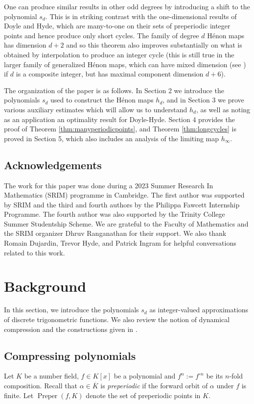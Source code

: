 \documentclass[12pt]{amsart}
\DeclareMathOperator{\preper}{Preper}
\theoremstyle{definition}
\begin{document}
One can produce similar results in other odd degrees by introducing a shift to the polynomial $s_d$.  This is in striking contrast with the one-dimensional results of Doyle and Hyde, which are many-to-one on their sets of preperiodic integer points and hence produce only short cycles.  The family of degree $d$ H\'enon maps has dimension $d+2$ and so this theorem also improves substantially on what is obtained by interpolation to produce an integer cycle (this is still true in the larger family of generalized H\'enon maps, which can have mixed dimension (see \cite{FriMil}) if $d$ is a composite integer, but has maximal component dimension $d+6$). 

The organization of the paper is as follows.  In Section 2 we introduce the polynomials $s_d$ used to construct the H\'enon maps $h_d$, and in Section 3 we prove various auxiliary estimates which will allow us to understand $h_d$, as well as noting as an application an optimality result for Doyle-Hyde.  Section 4 provides the proof of Theorem \ref{thm:manyperiodicpoints}, and Theorem \ref{thm:longcycles} is proved in Section 5, which also includes an analysis of the limiting map $h_{\infty}.$

\subsection*{Acknowledgements} The work for this paper was done during a 2023 Summer Research In Mathematics (SRIM) programme in Cambridge.  The first author was supported by SRIM and the third and fourth authors by the Philippa Fawcett Internship Programme. The fourth author was also supported by the Trinity College Summer Studentship Scheme. We are grateful to the Faculty of Mathematics and the SRIM organizer Dhruv Ranganathan for their support. We also thank Romain Dujardin, Trevor Hyde, and Patrick Ingram for helpful conversations related to this work.

\section{Background}

In this section, we introduce the polynomials $s_d$ as integer-valued approximations of discrete trigonometric functions.  We also review the notion of dynamical compression and the constructions given in \cite{doyle2022polynomialsrationalpreperiodicpoints}.

\subsection{Compressing polynomials} Let $K$ be a number field, $f\in K[x]$ be a polynomial and $f^n := f^{\circ n}$ be its $n$-fold composition. Recall that $\alpha\in \overline{K}$ is \textit{preperiodic} if the forward orbit of $\alpha$ under $f$ is finite. Let $\preper(f,K)$ denote the set of preperiodic points in $K$. 
\end{document}
